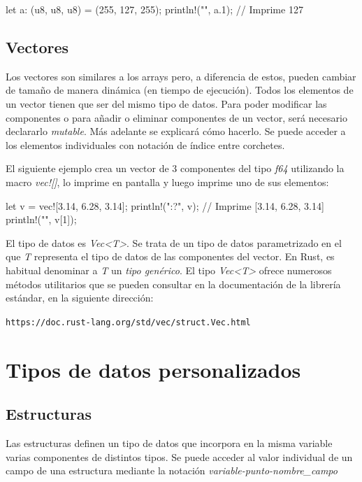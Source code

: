 \vspace{0.7em}
\begin{Codigo}
let a: (u8, u8, u8) = (255, 127, 255);
println!("{}", a.1); // Imprime 127
\end{Codigo}

\subsection{Vectores}
\noindent Los vectores son similares a los arrays pero, a diferencia de estos, pueden cambiar de tamaño de manera dinámica (en tiempo de ejecución). Todos los elementos de un vector tienen que ser del mismo tipo de datos. Para poder modificar las componentes o para añadir o eliminar componentes de un vector, será necesario declararlo \textit{mutable}. Más adelante se explicará cómo hacerlo. Se puede acceder a los elementos individuales con notación de índice entre corchetes. 

El siguiente ejemplo crea un vector de 3 componentes del tipo \textit{f64} utilizando la macro \textit{vec![]}, lo imprime en pantalla y luego imprime uno de sus elementos:

\vspace{0.7em}
\begin{Codigo}
let v = vec![3.14, 6.28, 3.14];
println!("{:?}", v); // Imprime [3.14, 6.28, 3.14]
println!("{}", v[1]);
\end{Codigo}

El tipo de datos es \textit{Vec<T>}. Se trata de un tipo de datos parametrizado en el que \textit{T} representa el tipo de datos de las componentes del vector. En Rust, es habitual denominar a \textit{T} un \textit{tipo genérico}. El tipo \textit{Vec<T>} ofrece numerosos métodos utilitarios que se pueden consultar en la documentación de la librería estándar, en la siguiente dirección:

{\centering \texttt{https://doc.rust-lang.org/std/vec/struct.Vec.html} \par}   

\section{Tipos de datos personalizados}
\label{sec_tipos_personalizados}

\subsection{Estructuras}
\noindent Las estructuras definen un tipo de datos que incorpora en la misma variable varias componentes de distintos tipos. Se puede acceder al valor individual de un campo de una estructura mediante la notación \textit{variable-punto-nombre\_campo}

